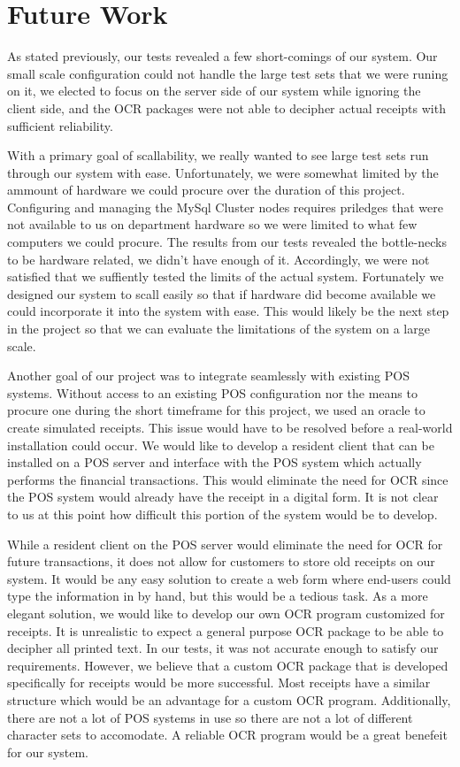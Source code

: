\section{Future Work}

As stated previously, our tests revealed a few short-comings of our system.  Our small scale configuration could not handle the large test sets that we were runing on it, we elected to focus on the server side of our system while ignoring the client side, and the OCR packages were not able to decipher actual receipts with sufficient reliability.

With a primary goal of scallability, we really wanted to see large test sets run through our system with ease.  Unfortunately, we were somewhat limited by the ammount of hardware we could procure over the duration of this project.  Configuring and managing the MySql Cluster nodes requires priledges that were not available to us on department hardware so we were limited to what few computers we could procure.  The results from our tests revealed the bottle-necks to be hardware related, we didn't have enough of it.  Accordingly, we were not satisfied that we suffiently tested the limits of the actual system.  Fortunately we designed our system to scall easily so that if hardware did become available we could incorporate it into the system with ease.  This would likely be the next step in the project so that we can evaluate the limitations of the system on a large scale.

Another goal of our project was to integrate seamlessly with existing POS systems.  Without access to an existing POS configuration nor the means to procure one during the short timeframe for this project, we used an oracle to create simulated receipts.  This issue would have to be resolved before a real-world installation could occur.  We would like to develop a resident client that can be installed on a POS server and interface with the POS system which actually performs the financial transactions.  This would eliminate the need for OCR since the POS system would already have the receipt in a digital form.  It is not clear to us at this point how difficult this portion of the system would be to develop.

While a resident client on the POS server would eliminate the need for OCR for future transactions, it does not allow for customers to store old receipts on our system.  It would be any easy solution to create a web form where end-users could type the information in by hand, but this would be a tedious task.  As a more elegant solution, we would like to develop our own OCR program customized for receipts.  It is unrealistic to expect a general purpose OCR package to be able to decipher all printed text.  In our tests, it was not accurate enough to satisfy our requirements.  However, we believe that a custom OCR package that is developed specifically for receipts would be more successful.  Most receipts have a similar structure which would be an advantage for a custom OCR program.  Additionally, there are not a lot of POS systems in use so there are not a lot of different character sets to accomodate.  A reliable OCR program would be a great benefeit for our system.
